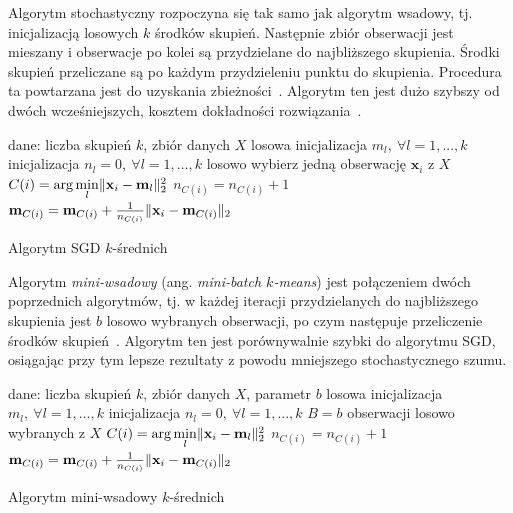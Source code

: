 \documentclass{praca1}
\DeclarePairedDelimiter{\norm}{\lVert}{\rVert}
\begin{document}
Algorytm stochastyczny rozpoczyna się tak samo jak algorytm wsadowy, tj. inicjalizacją losowych $k$ środków skupień. Następnie zbiór obserwacji jest mieszany i obserwacje po kolei są przydzielane do najbliższego skupienia. Środki skupień przeliczane są po każdym przydzieleniu punktu do skupienia. Procedura ta powtarzana jest do uzyskania zbieżności~\cite{Bottou1995:convergenceproperties}. Algorytm ten jest dużo szybszy od dwóch wcześniejszych, kosztem dokładności rozwiązania~\cite{Bottou2012:sgdtricks}.

\begin{algorithm}[h!]
\begin{algorithmic}[1]
		\State dane: liczba skupień $k$, zbiór danych $X$
        \State losowa inicjalizacja $m_l, \ \forall l=1, ..., k$
        \State inicjalizacja $n_l = 0, \ \forall l=1, \ldots, k$
        \Repeat
        	\State losowo wybierz jedną obserwację $\mathbf{x}_i$ z $X$
                \State $C(i) = \arg \min\limits_{l} \norm{\mathbf{x}_i - \mathbf{m}_l }_2^2 $
                \State $n_{C(i)} = n_{C(i)} + 1$
                \State $\mathbf{m}_{C(i)} = \mathbf{m}_{C(i)} + \frac{1}{n_{C(i)}}\norm{\mathbf{x}_i - \mathbf{m}_{C(i)}}_2$
\end{algorithmic}
\caption{Algorytm SGD $k$-średnich}\label{alg:002}
\end{algorithm}

Algorytm \emph{mini-wsadowy} (ang. \emph{mini-batch $k$-means}) jest połączeniem dwóch poprzednich algorytmów, tj. w każdej iteracji przydzielanych do najbliższego skupienia jest $b$ losowo wybranych obserwacji, po czym następuje przeliczenie środków skupień~\cite{Sculley2010:webkmeans}. Algorytm ten jest porównywalnie szybki do algorytmu SGD, osiągając przy tym lepsze rezultaty z powodu mniejszego stochastycznego szumu.

\begin{algorithm}[h!]
\begin{algorithmic}[1]
		\State dane: liczba skupień $k$, zbiór danych $X$, parametr $b$
        \State losowa inicjalizacja $m_l, \ \forall l=1, ..., k$
        \State inicjalizacja $n_l = 0, \ \forall l=1, ..., k$
        \Repeat
        	\State $B = b$ obserwacji losowo wybranych z $X$
                \State $C(i) = \arg \min\limits_{l} \norm{\mathbf{x}_i - \mathbf{m}_l }_2^2 $
            \EndFor
                \State $n_{C(i)} = n_{C(i)} + 1$
                \State $\mathbf{m}_{C(i)} = \mathbf{m}_{C(i)} + \frac{1}{n_{C(i)}}\norm{\mathbf{x}_i - \mathbf{m}_{C(i)}}_2$
            \EndFor
\end{algorithmic}
\caption{Algorytm mini-wsadowy $k$-średnich}\label{alg:003}
\end{algorithm}
\end{document}
